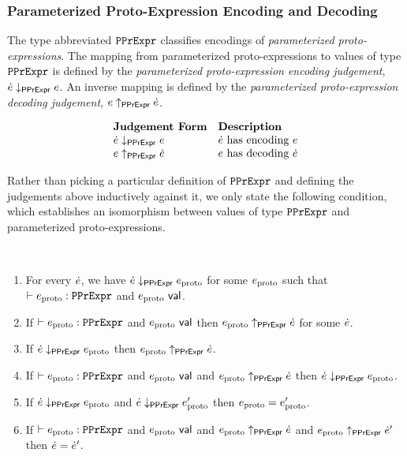\subsubsection{Parameterized Proto-Expression Encoding and Decoding}
The type abbreviated $\mathtt{PPrExpr}$ classifies encodings of \emph{parameterized proto-expressions}. The mapping from parameterized proto-expressions to values of type $\mathtt{PPrExpr}$ is defined by the \emph{parameterized proto-expression encoding judgement}, $\dot{e} \downarrow_\mathsf{PPrExpr} e$. An inverse mapping is defined by the \emph{parameterized proto-expression decoding judgement}, $e \uparrow_\mathsf{PPrExpr} \dot{e}$.

\[\begin{array}{ll}
\textbf{Judgement Form} & \textbf{Description}\\
\dot{e} \downarrow_\mathsf{PPrExpr} e & \text{$\dot{e}$ has encoding $e$}\\
e \uparrow_\mathsf{PPrExpr} \dot{e} & \text{$e$ has decoding $\dot{e}$}
\end{array}\]

Rather than picking a particular definition of $\mathtt{PPrExpr}$ and defining the judgements above inductively against it, we only state the following condition, which establishes an isomorphism between values of type $\mathtt{PPrExpr}$ and parameterized proto-expressions.

\begin{condition}\label{condition:parameterized-proto-expression-isomorphism} ~
\begin{enumerate}
\item For every $\dot{e}$, we have $\dot{e} \downarrow_\mathsf{PPrExpr} e_\text{proto}$ for some $e_\text{proto}$ such that $\vdash e_\text{proto} : \mathtt{PPrExpr}$ and $e_\text{proto}~\mathsf{val}$.
\item If $\vdash e_\text{proto} : \mathtt{PPrExpr}$ and $e_\text{proto}~\mathsf{val}$ then $e_\text{proto} \uparrow_\mathsf{PPrExpr} \dot{e}$ for some $\dot{e}$.
\item If $\dot{e} \downarrow_\mathsf{PPrExpr} e_\text{proto}$ then $e_\text{proto} \uparrow_\mathsf{PPrExpr} \dot{e}$.
\item If $\vdash e_\text{proto} : \mathtt{PPrExpr}$ and $e_\text{proto}~\mathsf{val}$ and $e_\text{proto} \uparrow_\mathsf{PPrExpr} \dot{e}$ then $\dot{e} \downarrow_\mathsf{PPrExpr} e_\text{proto}$.
\item If $\dot{e} \downarrow_\mathsf{PPrExpr} e_\text{proto}$ and $\dot{e} \downarrow_\mathsf{PPrExpr} e_\text{proto}'$ then $e_\text{proto}=e_\text{proto}'$.
\item If $\vdash e_\text{proto} : \mathtt{PPrExpr}$ and $e_\text{proto}~\mathsf{val}$ and $e_\text{proto} \uparrow_\mathsf{PPrExpr} \dot{e}$ and $e_\text{proto} \uparrow_\mathsf{PPrExpr} \dot{e}'$ then $\dot{e}=\dot{e}'$.
\end{enumerate}
\end{condition}

